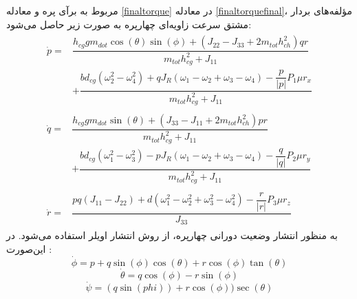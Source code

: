 مربوط به برآی پره و معادله 
\ref{finaltorque}
در معادله 
\ref{finaltorquefinal}،
مؤلفه‌های بردار مشتق سرعت زاویه‌ای چهارپره به صورت زیر حاصل می‌شود:
\begin{align}
	\begin{split}
		\dot{p} =& \dfrac{h_{cg}gm_{dot}\cos(\theta)\sin(\phi)
			+\left(J_{22} - J_{33} +2m_{tot}h_{ch}^2\right)qr
		}
		{m_{tot}h_{cg}^2 + J_{11}} \\
		&+\dfrac{bd_{cg}\left(\omega_2^2-\omega_4^2\right) + qJ_R(\omega_1-\omega_2+\omega_3-\omega_4) - \dfrac{p}{\lvert p \rvert}P_1\mu r_x}
		{m_{tot}h_{cg}^2 + J_{11}}
	\end{split}\\[1em]
		\begin{split}
		\dot{q} =& \dfrac{h_{cg}gm_{dot}\sin(\theta)
			+\left(J_{33} - J_{11} +2m_{tot}h_{ch}^2\right)pr
		}
		{m_{tot}h_{cg}^2 + J_{11}} \\
		&+\dfrac{bd_{cg}\left(\omega_1^2-\omega_3^2\right) - pJ_R(\omega_1-\omega_2+\omega_3-\omega_4)- \dfrac{q}{\lvert q \rvert}P_2\mu r_y}
		{m_{tot}h_{cg}^2 + J_{11}}
	\end{split}\\[1em]
	\begin{split}
		\dot{r} =& \dfrac{pq(J_{11}-J_{22})
		+ d(\omega_1^2-\omega_2^2+\omega_3^2-\omega_4^2) - \dfrac{r}{\lvert r \rvert}P_3\mu r_z
	}{J_{33}}
	\end{split}
\end{align}
به منظور انتشار وضعیت دورانی چهارپره، از روش انتشار اویلر استفاده می‌شود. در این‌صورت
\cite{zipfel2000modeling}
:
$$\dot\phi = p + q\sin(\phi)\cos(\theta) +‌
r\cos(\phi)\tan(\theta)
$$
$$
\dot \theta = q\cos(\phi) - r\sin(\phi)
$$
$$
\dot\psi = (q\sin(phi)) + r\cos(\phi))\sec(\theta) 
$$

